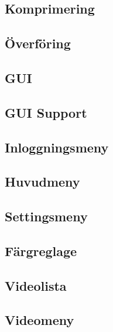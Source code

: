 \subsection{Komprimering}


\subsection{Överföring}


\subsection{GUI}


\subsection{GUI Support}


\subsection{Inloggningsmeny}


\subsection{Huvudmeny}


\subsection{Settingsmeny}


\subsection{Färgreglage}


\subsection{Videolista}


\subsection{Videomeny}

